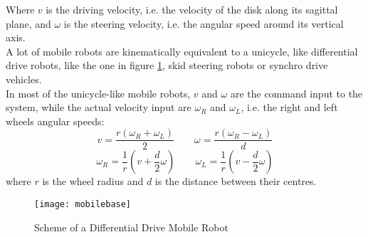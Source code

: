 Where $v$ is the driving velocity, i.e. the velocity of the disk along its sagittal plane, and $\omega$ is the steering velocity, i.e. the angular speed around its vertical axis.\\
A lot of mobile robots are kinematically equivalent to a unicycle, like differential drive robots, like the one in figure \ref{fig:mobilebase}, skid steering robots or synchro drive vehicles.\\
In most of the unicycle-like mobile robots, $v$ and $\omega$ are the command input to the system, while the actual velocity input are $\omega_R$ and $\omega_L$, i.e. the right and left wheels angular speeds: 
\begin{equation}
v=\frac{r\left(\omega_R + \omega_L\right)}{2} \qquad \omega=\frac{r\left(\omega_R - \omega_L\right)}{d}
\end{equation}
\begin{equation}
\omega_R =\frac{1}{r}\left(v+\frac{d}{2}\omega\right) \qquad \omega_L=\frac{1}{r}\left(v-\frac{d}{2}\omega\right)
\end{equation}
where $r$ is the wheel radius and $d$ is the distance between their centres.
\begin{figure}[h!]
	\centering
	\texttt{[image: mobilebase]}
	\caption{Scheme of a Differential Drive Mobile Robot}
	\label{fig:mobilebase}
\end{figure}
